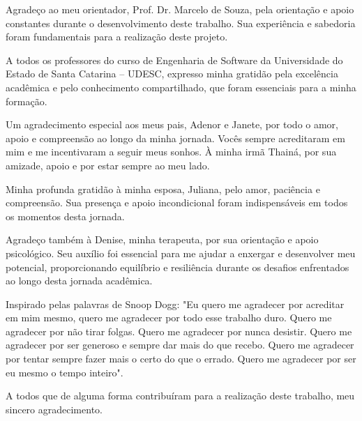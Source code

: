 \begin{agradecimentos}
	Agradeço ao meu orientador, Prof. Dr. Marcelo de Souza, pela orientação e apoio constantes durante o desenvolvimento deste trabalho. Sua experiência e sabedoria foram fundamentais para a realização deste projeto.

	A todos os professores do curso de Engenharia de Software da Universidade do Estado de Santa Catarina -- UDESC, expresso minha gratidão pela excelência acadêmica e pelo conhecimento compartilhado, que foram essenciais para a minha formação.

	Um agradecimento especial aos meus pais, Adenor e Janete, por todo o amor, apoio e compreensão ao longo da minha jornada. Vocês sempre acreditaram em mim e me incentivaram a seguir meus sonhos. À minha irmã Thainá, por sua amizade, apoio e por estar sempre ao meu lado.

	Minha profunda gratidão à minha esposa, Juliana, pelo amor, paciência e compreensão. Sua presença e apoio incondicional foram indispensáveis em todos os momentos desta jornada.

	Agradeço também à Denise, minha terapeuta, por sua orientação e apoio psicológico. Seu auxílio foi essencial para me ajudar a enxergar e desenvolver meu potencial, proporcionando equilíbrio e resiliência durante os desafios enfrentados ao longo desta jornada acadêmica.

	Inspirado pelas palavras de Snoop Dogg: "Eu quero me agradecer por acreditar em mim mesmo, quero me agradecer por todo esse trabalho duro. Quero me agradecer por não tirar folgas. Quero me agradecer por nunca desistir. Quero me agradecer por ser generoso e sempre dar mais do que recebo. Quero me agradecer por tentar sempre fazer mais o certo do que o errado. Quero me agradecer por ser eu mesmo o tempo inteiro".

	A todos que de alguma forma contribuíram para a realização deste trabalho, meu sincero agradecimento.
\end{agradecimentos}
